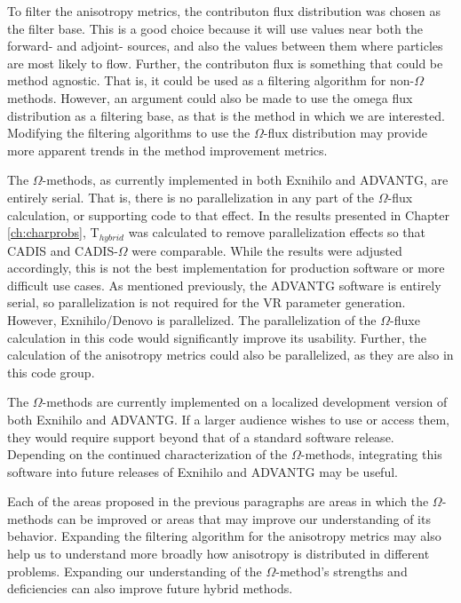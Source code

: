 To filter the anisotropy metrics, the contributon flux distribution was chosen
as the filter base. This is a good choice because it will use values near both
the forward- and adjoint- sources, and also the values between them where
particles are most likely to flow. Further, the contributon flux is something
that could be method agnostic. That is, it could be used as a filtering
algorithm for non-$\Omega$ methods. However, an argument could also be made to
use the omega flux distribution as a filtering base, as that is the method in
which we are interested. Modifying the filtering algorithms to use the
$\Omega$-flux distribution may provide more apparent trends in the method
improvement metrics.

The $\Omega$-methods, as currently implemented in both Exnihilo and ADVANTG, are
entirely serial. That is, there is no parallelization in any part of the
$\Omega$-flux calculation, or supporting code to that effect. In the results
presented in Chapter \ref{ch:charprobs}, T$_{hybrid}$ was calculated to remove
parallelization effects so that CADIS and CADIS-$\Omega$ were comparable. While
the results were adjusted accordingly, this is not the best implementation for
production software or more difficult use cases. As mentioned previously, the
ADVANTG software is entirely serial, so parallelization is not required for the
VR parameter generation. However, Exnihilo/Denovo is parallelized. The
parallelization of the $\Omega$-fluxe calculation in this code would significantly improve its
usability. Further, the calculation of the anisotropy metrics could also be
parallelized, as they are also in this code group.

The $\Omega$-methods are currently implemented on a localized
development version of both Exnihilo and ADVANTG. If a larger audience wishes to
use or access them, they would require support beyond that of a standard
software release. Depending on the continued characterization of the
$\Omega$-methods, integrating this software into future releases of Exnihilo and
ADVANTG may be useful.

Each of the areas proposed in the previous paragraphs are areas in which the
$\Omega$-methods can be improved or areas that may improve our understanding of
its behavior. Expanding the filtering algorithm for the anisotropy metrics may
also help us to understand more broadly how anisotropy is distributed in
different problems. Expanding our understanding of the $\Omega$-method's
strengths and deficiencies can also improve future hybrid methods.

